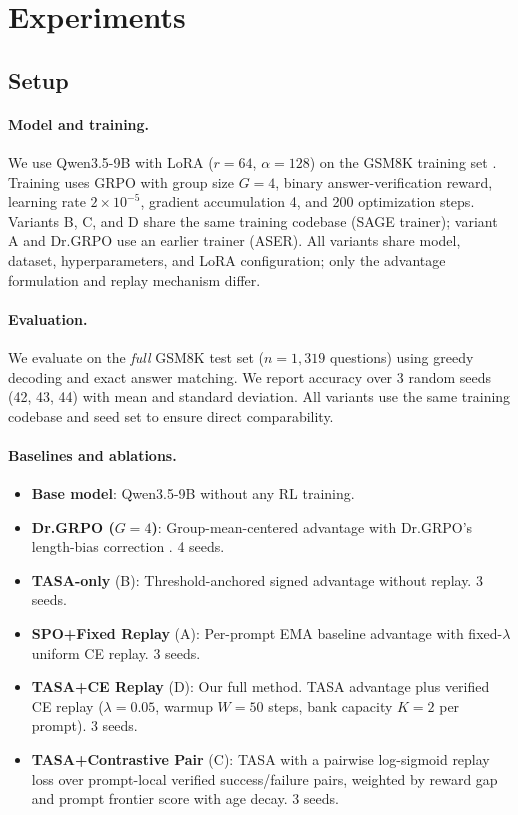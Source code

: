 \section{Experiments}
\label{sec:exp}

\subsection{Setup}

\paragraph{Model and training.}
We use Qwen3.5-9B \citep{qwen2025} with LoRA ($r{=}64$, $\alpha{=}128$) on the GSM8K training set \citep{cobbe2021gsm8k}.
Training uses GRPO with group size $G{=}4$, binary answer-verification reward, learning rate $2{\times}10^{-5}$, gradient accumulation 4, and 200 optimization steps.
Variants B, C, and D share the same training codebase (SAGE trainer); variant A and Dr.GRPO use an earlier trainer (ASER).
All variants share model, dataset, hyperparameters, and LoRA configuration; only the advantage formulation and replay mechanism differ.

\paragraph{Evaluation.}
We evaluate on the \emph{full} GSM8K test set ($n{=}1{,}319$ questions) using greedy decoding and exact answer matching.
We report accuracy over 3 random seeds (42, 43, 44) with mean and standard deviation.
All variants use the same training codebase and seed set to ensure direct comparability.

\paragraph{Baselines and ablations.}
\begin{itemize}[leftmargin=*,topsep=2pt,itemsep=1pt]
\item \textbf{Base model}: Qwen3.5-9B without any RL training.
\item \textbf{Dr.GRPO ($G{=}4$)}: Group-mean-centered advantage with Dr.GRPO's length-bias correction \citep{liu2025understanding}. 4 seeds.
\item \textbf{TASA-only} (B): Threshold-anchored signed advantage without replay. 3 seeds.
\item \textbf{SPO+Fixed Replay} (A): Per-prompt EMA baseline advantage with fixed-$\lambda$ uniform CE replay. 3 seeds.
\item \textbf{TASA+CE Replay} (D): Our full method. TASA advantage plus verified CE replay ($\lambda{=}0.05$, warmup $W{=}50$ steps, bank capacity $K{=}2$ per prompt). 3 seeds.
\item \textbf{TASA+Contrastive Pair} (C): TASA with a pairwise log-sigmoid replay loss over prompt-local verified success/failure pairs, weighted by reward gap and prompt frontier score with age decay. 3 seeds.
\end{itemize}

